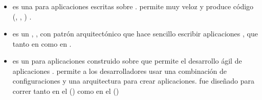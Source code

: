 \subsubsection{\isomorphicJSFwASref}
	\begin{itemize}
		\item
			\textbf{\meteorNAME} es una \frameworkPC  \openSourcePC \realTimeINT para aplicaciones \webINT \javaScriptNAME escritas sobre \nodejsNAME \cite{online_meteor_documentation}. \meteorNAME permite \prototypingCPT muy veloz \cite{online_meteor_documentation_why} y produce código \crossPlatform (\webINT, \androidNAME, \iosNAME) \cite{online_meteor_cross_platform}.

		\item
			\textbf{\derbyNAME} \cite{online_technology_derby_officialsite} es un \frameworkPC \fullstackAS, \isomorphicAS, con patrón arquitectónico \mvcAS que hace sencillo escribir aplicaciones \collaborativeQA, \realTimeINT que \runCPT tanto en \nodejsNAME como en \browsersINT \cite{online_technology_isomorphic_javascript_frameworks}.
		
		\item
			\textbf{\mojitoNAME} es un \frameworkPC para aplicaciones \mvcAS construido sobre \yuiThreeNAME que permite el desarrollo ágil de aplicaciones \webINT. \mojitoNAME permite a los desarrolladores usar una combinación de configuraciones y una arquitectura \mvcAS para crear aplicaciones. \mojitoNAME fue diseñado para correr tanto en el \serverSideAS (\nodejsNAME) como en el \clientAS (\browserINT) \cite{online_technology_mojito_officialsite_docs_intro}


\end{itemize}
